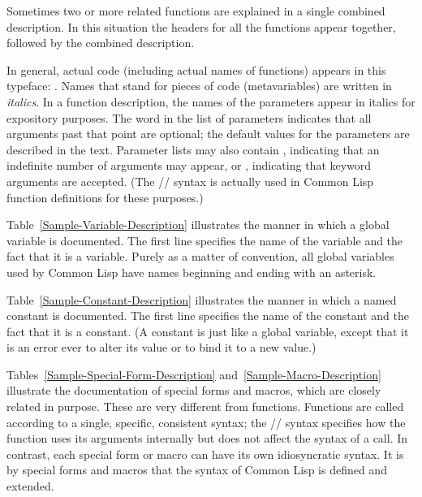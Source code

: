 Sometimes two or more related functions are explained in a single
combined description.  In this situation the headers for all the
functions appear together, followed by the combined description.

In general, actual code (including actual names of functions)
appears in this typeface: .
Names that stand for pieces of code (metavariables) are written in
{\it italics}.  In a function description, the names of the parameters appear
in italics for expository purposes.  The word  in the
list of parameters indicates that all arguments past that point are
optional; the default values for the parameters are described in the
text.  Parameter lists may also contain , indicating that an
indefinite number of arguments may appear, or , indicating
that keyword arguments are accepted.
(The //
syntax is actually used in Common Lisp function definitions for these purposes.)

Table~\ref{Sample-Variable-Description} illustrates the manner in
which a global variable is documented.  The first line specifies the
name of the variable and the fact that it is a variable.
Purely as a matter of convention, all global variables used
by Common Lisp have names beginning and ending with an asterisk.

Table~\ref{Sample-Constant-Description} illustrates the manner in
which a named constant is documented.  The first line specifies the
name of the constant and the fact that it is a constant.
(A constant is just like a global variable, except that it is
an error ever to alter its value or to bind it to a new value.)

Tables~\ref{Sample-Special-Form-Description}
and~\ref{Sample-Macro-Description} illustrate the documentation
of special forms and macros, which are closely related in purpose.
These are very different from functions.
Functions are called according to a single, specific, consistent syntax;
the // syntax specifies how the function uses its arguments
internally but does not affect the syntax of a call.
In contrast, each special form or macro can have its own idiosyncratic syntax.
It is by special forms and macros that the syntax of Common Lisp is defined
and extended.

